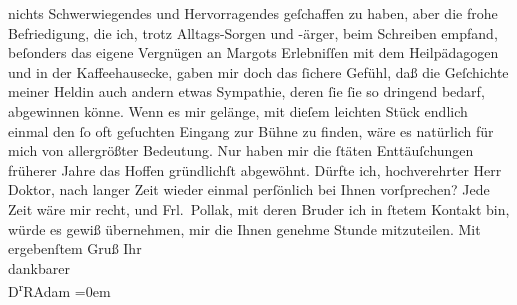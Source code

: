 \begin{ledgroupsized}[t]{13cm}
               nichts Schwerwiegendes und Hervorragendes geſchaffen zu haben, aber die frohe
               Befriedigung, die ich, trotz Alltags-Sorgen und -ärger, beim Schreiben {\pb}empfand, beſonders das eigene Vergnügen an
                  Margots Erlebniſſen mit dem
               Heilpädagogen und in der Kaffeehausecke, gaben mir doch das ſichere Gefühl, daß die
               Geſchichte meiner Heldin auch andern etwas Sympathie, deren ſie ſie so dringend
               bedarf, abgewinnen könne. Wenn es mir gelänge, mit dieſem leichten Stück endlich
               einmal den ſo oft geſuchten Eingang zur Bühne zu finden, wäre es natürlich für mich
               von allergrößter Bedeutung. Nur haben mir die ſtäten Enttäuſchungen früherer Jahre
               das Hoffen gründlichſt abgewöhnt.\pend
           \pstart
           {\pb}Dürfte ich, hochverehrter Herr Doktor,
               nach langer Zeit wieder einmal perſönlich bei Ihnen vorſprechen? Jede Zeit wäre mir
               recht, und Frl. Pollak, mit deren Bruder ich in ſtetem Kontakt
               bin, würde es gewiß übernehmen, mir die Ihnen genehme Stunde mitzuteilen.\pend
           \pstart
           Mit ergebenſtem Gruß Ihr{\\[\baselineskip]}dankbarer{\\[\baselineskip]}\spacefill\mbox{D\textsuperscript{r}RAdam}\pend
           \leftskip=0em{}\endnumbering{}\end{ledgroupsized}  \newcommand{\dateiname}{L02510}\newcommand{\titel}{Robert Adam an Arthur Schnitzler, 7. 6. 1929}\newcommand{\editorInnen}{Martin Anton Müller und Gerd-Hermann Susen}
      